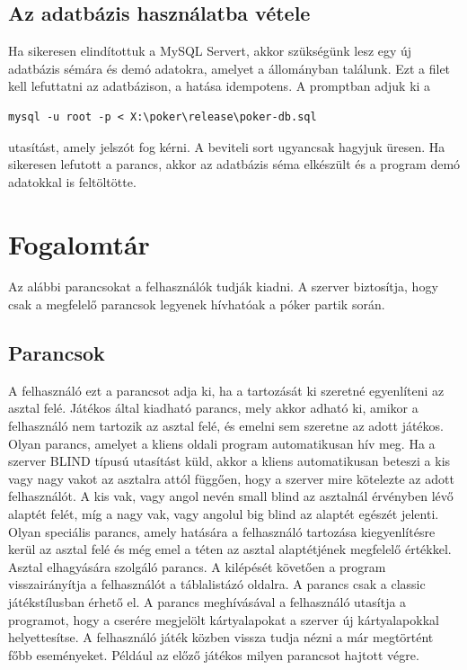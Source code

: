 \subsection{Az adatbázis használatba vétele}
Ha sikeresen elindítottuk a MySQL Servert, akkor szükségünk lesz egy új adatbázis sémára és demó adatokra, amelyet a  állományban találunk. Ezt a filet kell lefuttatni az adatbázison, a hatása idempotens. A promptban adjuk ki a
 \begin{verbatim}
mysql -u root -p < X:\poker\release\poker-db.sql
\end{verbatim}
utasítást, amely jelszót fog kérni. A beviteli sort ugyancsak hagyjuk üresen. Ha sikeresen lefutott a parancs, akkor az adatbázis séma elkészült és a program demó adatokkal is feltöltötte.

\section{Fogalomtár}
Az alábbi parancsokat a felhasználók tudják kiadni. A szerver biztosítja, hogy csak a megfelelő parancsok legyenek hívhatóak a póker partik során.
\subsection{Parancsok}
A felhasználó ezt a parancsot adja ki, ha a tartozását ki szeretné egyenlíteni az asztal felé.
Játékos által kiadható parancs, mely akkor adható ki, amikor a felhasználó nem tartozik az asztal felé, és emelni sem szeretne az adott játékos.
Olyan parancs, amelyet a kliens oldali program automatikusan hív meg. Ha a szerver BLIND típusú utasítást küld, akkor a kliens automatikusan beteszi a kis vagy nagy vakot az asztalra attól függően, hogy a szerver mire kötelezte az adott felhasználót. A kis vak, vagy angol nevén small blind az asztalnál érvényben lévő alaptét felét, míg a nagy vak, vagy angolul big blind az alaptét egészét jelenti.
Olyan speciális parancs, amely hatására a felhasználó tartozása kiegyenlítésre kerül az asztal felé és még emel a téten az asztal alaptétjének megfelelő értékkel.
Asztal elhagyására szolgáló parancs. A kilépését követően a program visszairányítja a felhasználót a táblalistázó oldalra.
A parancs csak a classic játékstílusban érhető el. A parancs meghívásával a felhasználó utasítja a programot, hogy a cserére megjelölt kártyalapokat a szerver új kártyalapokkal helyettesítse.
A felhasználó játék közben vissza tudja nézni a már megtörtént főbb eseményeket. Például az előző játékos milyen parancsot hajtott végre.
